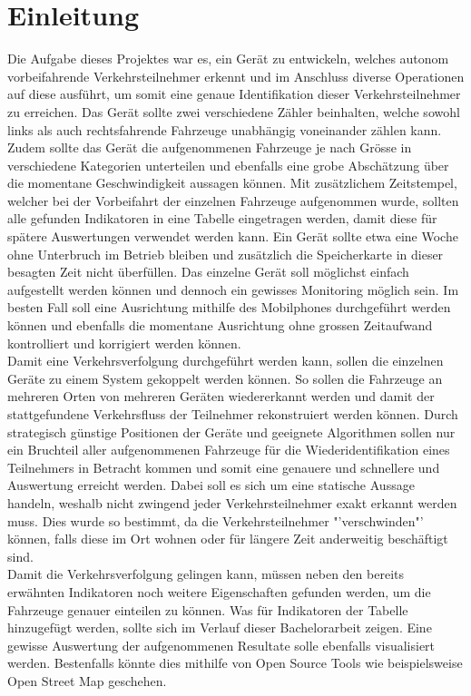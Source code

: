 \section{Einleitung}

Die Aufgabe dieses Projektes war es, ein Gerät zu entwickeln, welches autonom vorbeifahrende Verkehrsteilnehmer erkennt und im Anschluss diverse Operationen auf diese ausführt, um somit eine genaue Identifikation dieser Verkehrsteilnehmer zu erreichen. Das Gerät sollte zwei verschiedene Zähler beinhalten, welche sowohl links als auch rechtsfahrende Fahrzeuge unabhängig voneinander zählen kann. Zudem sollte das Gerät die aufgenommenen Fahrzeuge je nach Grösse in verschiedene Kategorien unterteilen und ebenfalls eine grobe Abschätzung über die momentane Geschwindigkeit aussagen können.  Mit zusätzlichem Zeitstempel, welcher bei der Vorbeifahrt der einzelnen Fahrzeuge aufgenommen wurde, sollten alle gefunden Indikatoren in eine Tabelle eingetragen werden, damit diese für spätere Auswertungen verwendet werden kann.  Ein Gerät sollte etwa eine Woche ohne Unterbruch im Betrieb bleiben und zusätzlich die Speicherkarte in dieser besagten Zeit nicht überfüllen. Das einzelne Gerät soll möglichst einfach aufgestellt werden können und dennoch ein gewisses Monitoring möglich sein. Im besten Fall soll eine Ausrichtung mithilfe des Mobilphones durchgeführt werden können und ebenfalls die momentane Ausrichtung ohne grossen Zeitaufwand kontrolliert und korrigiert werden können.\\
Damit eine Verkehrsverfolgung durchgeführt werden kann, sollen die einzelnen Geräte zu einem System gekoppelt werden können. So sollen die Fahrzeuge an mehreren Orten von mehreren Geräten wiedererkannt werden und damit der stattgefundene Verkehrsfluss der Teilnehmer rekonstruiert werden können. Durch strategisch günstige Positionen der Geräte und geeignete Algorithmen sollen nur ein Bruchteil aller aufgenommenen Fahrzeuge für die Wiederidentifikation eines Teilnehmers in Betracht kommen und somit eine genauere und schnellere und Auswertung erreicht werden. Dabei soll es sich um eine statische Aussage handeln, weshalb nicht zwingend jeder Verkehrsteilnehmer exakt erkannt werden muss. Dies wurde so bestimmt, da die Verkehrsteilnehmer "'verschwinden"' können, falls diese im Ort wohnen oder für längere Zeit anderweitig beschäftigt sind.\\
Damit die Verkehrsverfolgung gelingen kann, müssen neben den bereits erwähnten Indikatoren noch weitere Eigenschaften gefunden werden, um die Fahrzeuge genauer einteilen zu können. Was für Indikatoren der Tabelle hinzugefügt werden, sollte sich im Verlauf dieser Bachelorarbeit zeigen. Eine gewisse Auswertung der aufgenommenen Resultate solle ebenfalls visualisiert werden. Bestenfalls könnte dies mithilfe von Open Source Tools wie beispielsweise Open Street Map geschehen.

